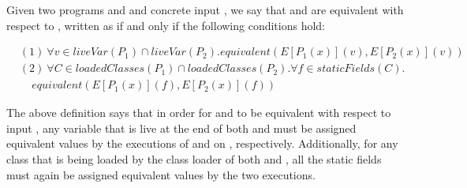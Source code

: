 \documentclass[runningheads,a4paper]{llncs}
\begin{document}
\begin{definition}\label{def:prog-equiv}
  Given two programs  and  and concrete input ,
  we say that  and  are equivalent
  with respect to , written as 
  if and only if the following conditions hold:

\[
    \begin{aligned}
      & (1)~ \forall v\in liveVar(P_1)\cap liveVar(P_2). equivalent(E[P_1(x)](v), E[P_2(x)](v))\\
& (2)~  \forall C \in loadedClasses(P_1) \cap loadedClasses(P_2).\forall f \in staticFields(C).\\
  &  ~~~~~ equivalent(E[P_1(x)](f), E[P_2(x)](f))
    \end{aligned}
    \]
   
  \end{definition}

The above definition says that in order for  and
 to be equivalent with respect to input , any variable
that is live at the end of both  and  must be
assigned equivalent values by the executions of  and
 on , respectively.
Additionally, for any class that
is being loaded by the class loader of both  and ,
all the static fields must again be assigned equivalent values by the
two executions. %
\end{document}
